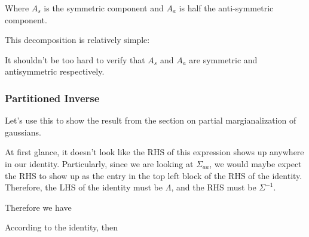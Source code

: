 \documentclass[12pt]{article}
\begin{document}
Where $A_s$ is the symmetric component and $A_a$ is half the anti-symmetric component.

This decomposition is relatively simple:

It shouldn't be too hard to verify that $A_s$ and $A_a$ are symmetric and antisymmetric respectively.

\subsubsection{Partitioned Inverse}


Let's use this to show the result from the section on partial margianalization of gaussians.


At first glance, it doesn't look like the RHS of this expression shows up anywhere in our identity. Particularly, since we are looking at $\Sigma_{aa}$, we would maybe expect the RHS to show up as the entry in the top left block of the RHS of the identity. Therefore, the LHS of the identity must be $\Lambda$, and the RHS must be $\Sigma^{-1}$.

Therefore we have

According to the identity, then 

\end{document}
